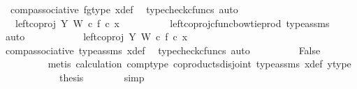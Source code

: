 \begin{isabellebody}
\ \ comp{\isacharunderscore}{\kern0pt}associative{}\ fg{\isacharunderscore}{\kern0pt}type\ x{\isacharunderscore}{\kern0pt}def\ \isamarkupfalse%
\ {\isacharparenleft}{\kern0pt}typecheck{\isacharunderscore}{\kern0pt}cfuncs{\isacharcomma}{\kern0pt}\ auto{\isacharparenright}{\kern0pt}\isanewline
\ \ \ \ \ \ \isamarkupfalse%
\ \isamarkupfalse%
\ {\isachardoublequoteopen}{\isachardot}{\kern0pt}{\isachardot}{\kern0pt}{\isachardot}{\kern0pt}\ {\isacharequal}{\kern0pt}\ {\isacharparenleft}{\kern0pt}left{\isacharunderscore}{\kern0pt}coproj\ Y\ W\ {\isasymcirc}\isactrlsub c\ f{\isacharparenright}{\kern0pt}\ {\isasymcirc}\isactrlsub c\ x{\isachardoublequoteclose}\isanewline
\ \ \ \ \ \ \ \ \isamarkupfalse%
\ left{\isacharunderscore}{\kern0pt}coproj{\isacharunderscore}{\kern0pt}cfunc{\isacharunderscore}{\kern0pt}bowtie{\isacharunderscore}{\kern0pt}prod\ type{\isacharunderscore}{\kern0pt}assms\ \isamarkupfalse%
\ auto\isanewline
\ \ \ \ \ \ \isamarkupfalse%
\ \isamarkupfalse%
\ {\isachardoublequoteopen}{\isachardot}{\kern0pt}{\isachardot}{\kern0pt}{\isachardot}{\kern0pt}\ {\isacharequal}{\kern0pt}\ left{\isacharunderscore}{\kern0pt}coproj\ Y\ W\ {\isasymcirc}\isactrlsub c\ f\ {\isasymcirc}\isactrlsub c\ x{\isachardoublequoteclose}\isanewline
\ \ \ \ \ \ \ \ \isamarkupfalse%
\ comp{\isacharunderscore}{\kern0pt}associative{}\ type{\isacharunderscore}{\kern0pt}assms{\isacharparenleft}{\kern0pt}{}{\isacharparenright}{\kern0pt}\ x{\isacharunderscore}{\kern0pt}def\ \isamarkupfalse%
\ {\isacharparenleft}{\kern0pt}typecheck{\isacharunderscore}{\kern0pt}cfuncs{\isacharcomma}{\kern0pt}\ auto{\isacharparenright}{\kern0pt}\isanewline
\ \ \ \ \ \ \isamarkupfalse%
\ \isamarkupfalse%
\ False\isanewline
\ \ \ \ \ \ \ \ \isamarkupfalse%
\ {\isacharparenleft}{\kern0pt}metis\ calculation\ comp{\isacharunderscore}{\kern0pt}type\ coproducts{\isacharunderscore}{\kern0pt}disjoint\ type{\isacharunderscore}{\kern0pt}assms{\isacharparenleft}{\kern0pt}{}{\isacharparenright}{\kern0pt}\ x{\isacharunderscore}{\kern0pt}def\ y{\isacharunderscore}{\kern0pt}type{}{\isacharparenright}{\kern0pt}\isanewline
\ \ \ \ \isamarkupfalse%
\isanewline
\ \ \ \ \isamarkupfalse%
\ \isamarkupfalse%
\ {\isacharquery}{\kern0pt}thesis\isanewline
\ \ \ \ \ \ \isamarkupfalse%
\ simp\isanewline
{}\isamarkupfalse%

\end{isabellebody}

